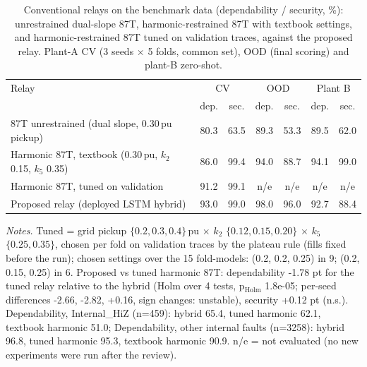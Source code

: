 \begin{table}[t]\centering
\caption{Conventional relays on the benchmark data (dependability / security, \%): unrestrained dual-slope 87T, harmonic-restrained 87T with textbook settings, and harmonic-restrained 87T tuned on validation traces, against the proposed relay. Plant-A CV (3 seeds $\times$ 5 folds, common set), OOD (final scoring) and plant-B zero-shot.}\label{tab:C_conventional}
\small\begin{tabular}{@{}lcccccc@{}}\toprule
Relay & \multicolumn{2}{c}{CV} & \multicolumn{2}{c}{OOD} & \multicolumn{2}{c}{Plant B} \\ & dep. & sec. & dep. & sec. & dep. & sec. \\ \midrule
87T unrestrained (dual slope, 0.30\,pu pickup) & 80.3 & 63.5 & 89.3 & 53.3 & 89.5 & 62.0 \\
Harmonic 87T, textbook (0.30\,pu, $k_2$ 0.15, $k_5$ 0.35) & 86.0 & 99.4 & 94.0 & 88.7 & 94.1 & 99.0 \\
Harmonic 87T, tuned on validation & 91.2 & 99.1 & n/e & n/e & n/e & n/e \\
\midrule
Proposed relay (deployed LSTM hybrid) & 93.0 & 99.0 & 98.0 & 96.0 & 92.7 & 88.4 \\
\bottomrule\end{tabular}
\vspace{3pt}\par\raggedright\footnotesize\textit{Notes.} Tuned = grid pickup $\{0.2, 0.3, 0.4\}$\,pu $\times$ $k_2$ $\{0.12, 0.15, 0.20\}$ $\times$ $k_5$ $\{0.25, 0.35\}$, chosen per fold on validation traces by the plateau rule (fills fixed before the run); chosen settings over the 15 fold-models: (0.2, 0.2, 0.25) in 9; (0.2, 0.15, 0.25) in 6. Proposed vs tuned harmonic 87T: dependability -1.78 pt for the tuned relay relative to the hybrid (Holm over 4 tests, p$_{\mathrm{Holm}}$ 1.8e-05; per-seed differences -2.66, -2.82, +0.16, sign changes: unstable), security +0.12 pt (n.s.). Dependability, Internal\_HiZ (n=459): hybrid 65.4, tuned harmonic 62.1, textbook harmonic 51.0; Dependability, other internal faults (n=3258): hybrid 96.8, tuned harmonic 95.3, textbook harmonic 90.9. n/e = not evaluated (no new experiments were run after the review).
\end{table}
